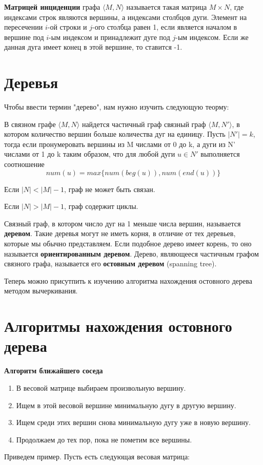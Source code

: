 \textbf{Матрицей инциденции} графа $\langle M, N\rangle$ называется такая матрица $M \times N$, 
где индексами строк являются вершины, а индексами столбцов дуги. Элемент на пересечении $i$-ой строки и $j$-ого
столбца равен 1, если является началом в вершине под $i$-ым индексом и принадлежит дуге под $j$-ым индексом. Если же данная
дуга имеет конец в этой вершине, то ставится -1.

\section{Деревья}
Чтобы ввести термин "дерево", нам нужно изучить следующую теорму:
\begin{thm}
    В связном графе $\langle M, N \rangle$ найдется частичный граф связный граф
    $\langle M, N' \rangle$, в котором количество вершин больше количества дуг на единицу. Пусть $|N'| = k$, 
    тогда если пронумеровать вершины из M числами от 0 до k, а дуги из N' числами от 1 до k
    таким образом, что для любой дуги $u \in N'$ выполняется соотношение
    \begin{equation}
        num(u) = max\{num(beg(u)), num(end(u))\}
    \end{equation}
\end{thm}
\begin{sle}
    Если $|N| < |M| - 1$, граф не может быть связан.
\end{sle}
\begin{sle}
    Если $|N| > |M| - 1$, граф содержит циклы.
\end{sle}

Связный граф, в котором число дуг на 1 меньше числа вершин, называется
\textbf{деревом}. Такие деревья могут не иметь корня, в отличие от тех деревьев,
которые мы обычно представляем. Если подобное дерево имеет корень, то оно называется 
\textbf{ориентированным деревом}.
Дерево, являющееся частичным графом связного графа, называется его \textbf{остовным деревом} (spanning tree).

Теперь можно присутпить к изучению алгоритма нахождения остовного дерева методом вычеркивания.

\hspace{5mm}

\section{Алгоритмы нахождения остовного дерева}
\textbf{Алгоритм ближайшего соседа}
\begin{enumerate}
    \item В весовой матрице выбираем произвольную вершину.
    \item Ищем в этой весовой вершине минимальную дугу в другую вершину.
    \item Ищем среди этих вершин снова минимальную дугу уже в новую вершину.
    \item Продолжаем до тех пор, пока не пометим все вершины.
\end{enumerate}
Приведем пример. Пусть есть следующая весовая матрица:

